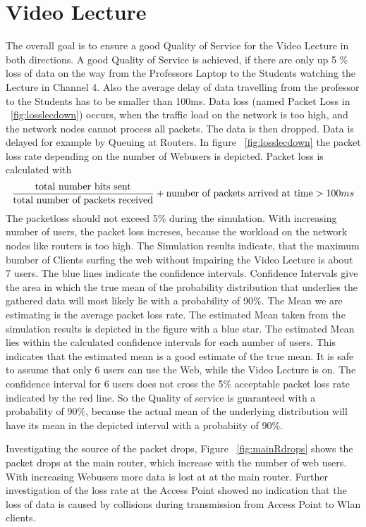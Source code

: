 \documentclass[a4paper,10pt]{book}\usepackage{graphicx}
\begin{document}
\section{Video Lecture}
The overall goal is to ensure a good Quality of Service for the Video Lecture in both directions.
A good Quality of Service is achieved, if there are only up 5 $\%$ loss of data
on the way from the Professors Laptop to the Students watching the Lecture in Channel 4. Also the average delay of data travelling from the professor to the Students has to be smaller than 100ms.
Data loss (named Packet Loss in ~\ref{fig:losslecdown}) occurs, when the traffic load on the network is too high, and the network nodes cannot process all packets.
The data is then dropped. Data is delayed for example by Queuing at Routers.
In figure  ~\ref{fig:losslecdown} the packet loss rate depending on the number of
Webusers is depicted. Packet loss is calculated with
\begin{equation}
 \frac{\textnormal{total number bits sent}}{\textnormal{total number of packets received}} + \textnormal{number of packets arrived at time} > 100ms
\end{equation}
The packetloss should not exceed 5$\%$ during the simulation.
With increasing number of users, the packet loss increses, because the 
workload on the network nodes like routers is too high.
The Simulation results indicate, that the maximum bumber of Clients surfing the 
web without impairing the Video Lecture is about 7 users.
The blue lines indicate the confidence intervals. Confidence Intervals give the area in which 
the true mean of the probability distribution that underlies the gathered data will most likely lie with a probability of 90$\%$.
The Mean we are estimating is the average packet loss rate. The estimated Mean taken from the simulation results is depicted in the figure with a blue star.
The estimated Mean lies within the calculated confidence intervals for each number of users. This indicates that the estimated mean is a good estimate of the true mean.
It is safe to assume that only 6 users can use the Web, while the Video Lecture is on.
The confidence interval for 6 users does not cross the 5$\%$ acceptable packet loss 
rate indicated by the red line. So the Quality of service is guaranteed with a probability of 90$\%$, because the actual mean of the
underlying distribution will have its mean in the depicted interval with a probabiity of 90$\%$.

Investigating the source of the packet drops, Figure ~\ref{fig:mainRdrops} shows the packet drops at the main router, which increase with the number of 
web users. With increasing Webusers more data is lost at at the main router. Further investigation of the loss rate at the Access Point showed no indication that 
the loss of data is caused by collisions during transmission from Access Point to Wlan clients.
\end{document}
